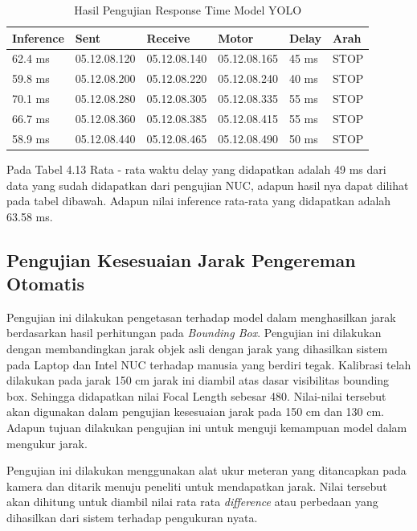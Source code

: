 \begin{table}[H]
  \centering
  \label{TabelHasilPengujianResponseTimeYOLO}
  \caption{Hasil Pengujian Response Time Model YOLO}
  \begin{tabular}{|l|l|l|l|l|l|}
  \hline
  Inference & Sent          & Receive       & Motor         & Delay   & Arah  \\ \hline
  62.4 ms   & 05.12.08.120  & 05.12.08.140  & 05.12.08.165  & 45 ms   & STOP \\ \hline
  59.8 ms   & 05.12.08.200  & 05.12.08.220  & 05.12.08.240  & 40 ms   & STOP \\ \hline
  70.1 ms   & 05.12.08.280  & 05.12.08.305  & 05.12.08.335  & 55 ms   & STOP \\ \hline
  66.7 ms   & 05.12.08.360  & 05.12.08.385  & 05.12.08.415  & 55 ms   & STOP \\ \hline
  58.9 ms   & 05.12.08.440  & 05.12.08.465  & 05.12.08.490  & 50 ms   & STOP \\ \hline
  \end{tabular}
\end{table}
Pada Tabel 4.13 Rata - rata waktu delay yang didapatkan adalah 49 ms dari data yang sudah didapatkan dari pengujian NUC, adapun hasil nya dapat dilihat pada tabel dibawah. Adapun nilai inference rata-rata yang didapatkan adalah  63.58 ms.

\subsection{Pengujian Kesesuaian Jarak Pengereman Otomatis}
Pengujian ini dilakukan pengetasan terhadap model dalam menghasilkan jarak berdasarkan hasil perhitungan pada \emph{Bounding Box}. Pengujian ini dilakukan dengan membandingkan jarak objek asli dengan jarak yang dihasilkan sistem pada Laptop dan Intel NUC terhadap manusia yang berdiri tegak. Kalibrasi telah dilakukan pada jarak 150 cm jarak ini diambil atas dasar visibilitas bounding box. Sehingga didapatkan nilai Focal Length sebesar 480. Nilai-nilai tersebut akan digunakan dalam pengujian kesesuaian jarak pada 150 cm dan 130 cm. Adapun tujuan dilakukan pengujian ini untuk menguji kemampuan model dalam mengukur jarak.

Pengujian ini dilakukan menggunakan alat ukur meteran yang ditancapkan pada kamera dan ditarik menuju peneliti untuk mendapatkan jarak. Nilai tersebut akan dihitung untuk diambil nilai rata rata \emph{difference} atau perbedaan yang dihasilkan dari sistem terhadap pengukuran nyata.

